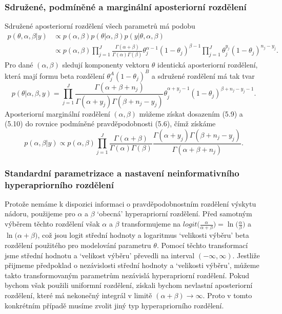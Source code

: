 \subsubsection{Sdružené, podmíněné a marginální aposteriorní rozdělení}

Sdružené aposteriorní rozdělení všech parametrů má podobu
\begin{equation}
\begin{split}
p(\theta, \alpha, \beta | y) & \varpropto p(\alpha, \beta) p(\theta | \alpha, \beta) p(y | \theta, \alpha, \beta)\\
 & \varpropto p(\alpha, \beta) \prod_{j = 1}^J \frac{\Gamma(\alpha + \beta)}{\Gamma(\alpha) \Gamma(\beta)} \theta_j^{\alpha - 1}(1 - \theta_j)^{\beta - 1} \prod_{j = 1}^J \theta_j^{y_j}(1 - \theta_j)^{n_j - y_j}.
\end{split}
\end{equation}
Pro dané $(\alpha, \beta)$ sledují komponenty vektoru $\theta$ identická aposteriorní rozdělení, která mají formu beta rozdělení $\theta_j^A(1 - \theta_j)^B$ a sdružené rozdělení má tak tvar
\begin{equation}
p(\theta | \alpha, \beta, y) = \prod_{j = 1}^J \frac{\Gamma(\alpha + \beta + n_j)}{\Gamma(\alpha + y_j)\Gamma(\beta + n_j - y_j)} \theta_j^{\alpha + y_j - 1}(1 - \theta_j)^{\beta + n_j - y_j - 1}.
\end{equation}
Aposteriorní marginální rozdělení $(\alpha, \beta)$ můžeme získat dosazením (5.9) a (5.10) do rovnice podmíněné pravděpodobnosti (5.6), čímž získáme
\begin{equation}
p(\alpha, \beta | y) \varpropto p(\alpha, \beta) \prod_{j = 1}^J \frac{\Gamma(\alpha + \beta)}{\Gamma(\alpha)\Gamma(\beta)} \frac{\Gamma(\alpha + y_j)\Gamma(\beta + n_j - y_j)}{\Gamma(\alpha + \beta + n_j)}.
\end{equation}

\subsubsection{Standardní parametrizace a nastavení neinformativního hyperapriorního rozdělení}

Protože nemáme k dispozici informaci o pravděpodobnostním rozdělení výskytu nádoru, použijeme pro $\alpha$ a $\beta$ `obecná' hyperapriorní rozdělení. Před samotným výběrem těchto rozdělení však $\alpha$ a $\beta$ transformujeme na $logit\big(\frac{\alpha}{\alpha + \beta}\big) = \ln\big(\frac{\alpha}{\beta}\big)$ a $\ln \big(\alpha + \beta \big)$, což jsou logit střední hodnoty a logaritmus `velikosti výběru' beta rozdělení použitého pro modelování parametru $\theta$. Pomocí těchto transformací jsme střední hodnotu a `velikost výběru' převedli na interval $(-\infty, \infty)$. Jestliže přijmeme předpoklad o nezávislosti střední hodnoty a `velikosti výběru', můžeme takto transformovaným parametrům nezávislá hyperapriorní rozdělení. Pokud bychom však použili uniformní rozdělení, získali bychom nevlastní aposteriorní rozdělení, které má nekonečný integrál v limitě $(\alpha + \beta) \rightarrow \infty$. Proto v tomto konkrétním případě musíme zvolit jiný typ hyperapriorního rozdělení.

